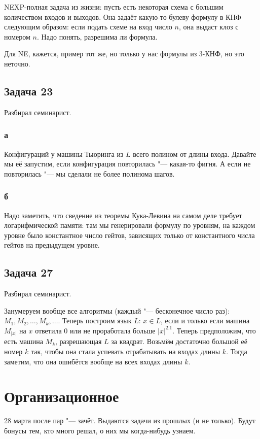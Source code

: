 		NEXP-полная задача из жизни: пусть есть некоторая схема с большим количеством входов и выходов.
		Она задаёт какую-то булеву формулу в КНФ следующим образом: если подать схеме на вход число $n$,
		она выдаст клоз с номером $n$.
		Надо понять, разрешима ли формула.

		Для NE, кажется, пример тот же, но только у нас формулы из 3-КНФ, но это неточно.

\subsection{Задача 23}
	Разбирал семинарист.

	\subsubsection{а}
		Конфигураций у машины Тьюринга из $L$ всего полином от длины входа.
		Давайте мы её запустим, если конфигурация повторилась "--- какая-то фигня.
		А если не повторилась "--- мы сделали не более полинома шагов.

	\subsubsection{б}
		Надо заметить, что сведение из теоремы Кука-Левина на самом деле требует логарифмической памяти:
		там мы генерировали формулу по уровням, на каждом уровне было константное число гейтов,
		зависящих только от константного числа гейтов на предыдущем уровне.

\subsection{Задача 27}
	Разбирал семинарист.

	Занумеруем вообще все алгоритмы (каждый "--- бесконечное число раз): $M_1, M_2, \dots, M_k, \dots$.%
	Теперь построим язык $L$: $x \in L$, если и только если машина $M_{|x|}$ на $x$ ответила 0 или не проработала
	больше $|x|^{2.1}$.
	Теперь предположим, что есть машина $M_k$, разрешающая $L$ за квадрат.
	Возьмём достаточно большой её номер $k$ так, чтобы она стала успевать отрабатывать на входах длины $k$.
	Тогда заметим, что она ошибётся вообще на всех входах длины $k$.

\section{Организационное}
	28 марта после пар "--- зачёт.
	Выдаются задачи из прошлых (и не только).
	Будут бонусы тем, кто много решал, о них мы когда-нибудь узнаем.
